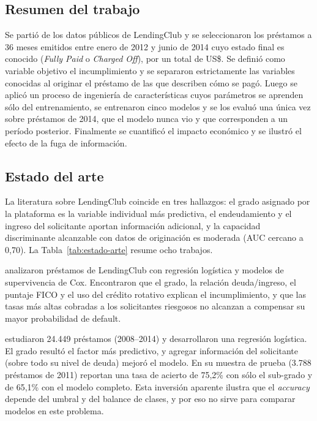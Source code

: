 \documentclass{article}
\begin{document}
\subsection{Resumen del trabajo}
Se partió de los datos públicos de LendingClub y se seleccionaron los
\nTotal{} préstamos a 36 meses emitidos entre enero de 2012 y junio de 2014 cuyo
estado final es conocido (\emph{Fully Paid} o \emph{Charged Off}), por un total
de US\$\montoTotal. Se definió como variable objetivo el incumplimiento y se
separaron estrictamente las variables conocidas al originar el préstamo de las
que describen cómo se pagó. Luego se aplicó un proceso de ingeniería de
características cuyos parámetros se aprenden sólo del entrenamiento, se entrenaron
cinco modelos y se los evaluó una única vez sobre préstamos de 2014, que el
modelo nunca vio y que corresponden a un período posterior. Finalmente se
cuantificó el impacto económico y se ilustró el efecto de la fuga de información.

\subsection{Estado del arte}
\label{sec:estado-arte}

La literatura sobre LendingClub coincide en tres hallazgos: el grado asignado por
la plataforma es la variable individual más predictiva, el endeudamiento y el
ingreso del solicitante aportan información adicional, y la capacidad
discriminante alcanzable con datos de originación es moderada (AUC cercano a
0,70). La Tabla~\ref{tab:estado-arte} resume ocho trabajos.

\citet{emekter2015} analizaron préstamos de LendingClub con
regresión logística y modelos de supervivencia de Cox. Encontraron que el grado,
la relación deuda/ingreso, el puntaje FICO y el uso del crédito rotativo explican
el incumplimiento, y que las tasas más altas cobradas a los solicitantes riesgosos
no alcanzan a compensar su mayor probabilidad de default.

\citet{serrano2015} estudiaron 24.449 préstamos (2008--2014) y desarrollaron una
regresión logística. El grado resultó el factor más predictivo, y agregar
información del solicitante (sobre todo su nivel de deuda) mejoró el modelo. En
su muestra de prueba (3.788 préstamos de 2011) reportan una tasa de acierto de
75,2\% con sólo el sub-grado y de 65,1\% con el modelo completo. Esta inversión
aparente ilustra que el \emph{accuracy} depende del umbral y del balance de
clases, y por eso no sirve para comparar modelos en este problema.
\end{document}

